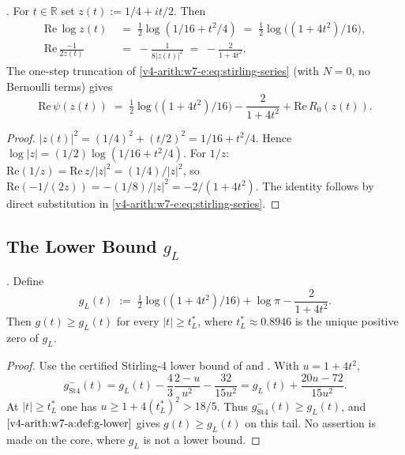 \begin{lemma}[real-part Stirling at \(z=1/4+it/2\)]
\label{v4-arith:w7-e:lem:re-psi}
\ClaimStatusProvedHere. For \(t\in\mathbb{R}\) set
\(z(t):=1/4+it/2\). Then
\begin{align}
\label{v4-arith:w7-e:eq:re-log-z}
\mathrm{Re}\,\log z(t)&\;=\;\tfrac{1}{2}\log(1/16+t^{2}/4)\;=\;\tfrac{1}{2}\log\bigl((1+4t^{2})/16\bigr),\\
\label{v4-arith:w7-e:eq:re-reciprocal-z}
\mathrm{Re}\,\frac{-1}{2z(t)}&\;=\;-\frac{1}{8|z(t)|^{2}}\;=\;-\frac{2}{1+4t^{2}}.
\end{align}
The one-step truncation of \eqref{v4-arith:w7-e:eq:stirling-series}
(with \(N=0\), no Bernoulli terms) gives
\begin{equation}
\label{v4-arith:w7-e:eq:stirling-1}
\mathrm{Re}\,\psi(z(t))\;=\;\tfrac{1}{2}\log\bigl((1+4t^{2})/16\bigr)-\frac{2}{1+4t^{2}}+\mathrm{Re}\,R_{0}(z(t)).
\end{equation}
\end{lemma}

\begin{proof}
\(|z(t)|^{2}=(1/4)^{2}+(t/2)^{2}=1/16+t^{2}/4\). Hence \(\log|z|=
(1/2)\log(1/16+t^{2}/4)\). For \(1/z\): \(\mathrm{Re}(1/z)=\mathrm{Re}\,z/|z|^{2}=(1/4)/|z|^{2}\),
so \(\mathrm{Re}(-1/(2z))=-(1/8)/|z|^{2}=-2/(1+4t^{2})\). The identity
follows by direct substitution in \eqref{v4-arith:w7-e:eq:stirling-series}.
\end{proof}

\subsection{The Lower Bound \(g_{L}\)}
\label{v4-arith:w7-e:g-lower-bound}

\begin{theorem}
\label{v4-arith:w7-e:thm:g-lower-bound}
\ClaimStatusProvedHere. Define
\begin{equation}
\label{v4-arith:w7-e:eq:g-L-def}
g_{L}(t)\;:=\;\tfrac{1}{2}\log\bigl((1+4t^{2})/16\bigr)+\log\pi-\frac{2}{1+4t^{2}}.
\end{equation}
Then \(g(t)\geq g_{L}(t)\) for every \(|t|\geq t_{L}^{\ast}\), where
\(t_{L}^{\ast}\approx 0.8946\) is the unique positive zero of \(g_{L}\).
\end{theorem}

\begin{proof}
Use the certified Stirling-4 lower bound of
 and
. With
\(u=1+4t^{2}\),
\[
g^{-}_{\mathrm{St4}}(t)
=g_{L}(t)-\frac{4}{3}\frac{2-u}{u^{2}}-\frac{32}{15u^{2}}
=g_{L}(t)+\frac{20u-72}{15u^{2}}.
\]
At \(|t|\geq t_{L}^{\ast}\) one has \(u\geq 1+4(t_{L}^{\ast})^{2}>18/5\).
Thus \(g^{-}_{\mathrm{St4}}(t)\geq g_{L}(t)\), and
\(\Cref{v4-arith:w7-a:def:g-lower}\) gives \(g(t)\geq g_{L}(t)\) on this
tail. No assertion is made on the core, where \(g_{L}\) is not a lower
bound.
\end{proof}

